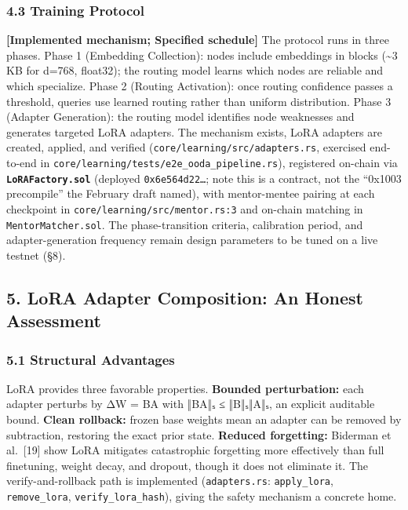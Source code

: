 \subsubsection{4.3 Training Protocol}\label{training-protocol}

\textbf{{[}Implemented mechanism; Specified schedule{]}} The protocol
runs in three phases. Phase 1 (Embedding Collection): nodes include
embeddings in blocks (\textasciitilde3 KB for d=768, float32); the
routing model learns which nodes are reliable and which specialize.
Phase 2 (Routing Activation): once routing confidence passes a
threshold, queries use learned routing rather than uniform distribution.
Phase 3 (Adapter Generation): the routing model identifies node
weaknesses and generates targeted LoRA adapters. The mechanism exists,
LoRA adapters are created, applied, and verified
(\texttt{core/learning/src/adapters.rs}, exercised end-to-end in
\texttt{core/learning/tests/e2e\_ooda\_pipeline.rs}), registered
on-chain via \textbf{\texttt{LoRAFactory.sol}} (deployed
\texttt{0x6e564d22…}; note this is a contract, not the ``0x1003
precompile'' the February draft named), with mentor-mentee pairing at
each checkpoint in \texttt{core/learning/src/mentor.rs:3} and on-chain
matching in \texttt{MentorMatcher.sol}. The phase-transition criteria,
calibration period, and adapter-generation frequency remain design
parameters to be tuned on a live testnet (§8).

\subsection{5. LoRA Adapter Composition: An Honest
Assessment}\label{lora-adapter-composition-an-honest-assessment}

\subsubsection{5.1 Structural Advantages}\label{structural-advantages}

LoRA provides three favorable properties. \textbf{Bounded perturbation:}
each adapter perturbs by ΔW = BA with ‖BA‖ₛ ≤ ‖B‖ₛ‖A‖ₛ, an explicit
auditable bound. \textbf{Clean rollback:} frozen base weights mean an
adapter can be removed by subtraction, restoring the exact prior state.
\textbf{Reduced forgetting:} Biderman et al.~{[}19{]} show LoRA
mitigates catastrophic forgetting more effectively than full finetuning,
weight decay, and dropout, though it does not eliminate it. The
verify-and-rollback path is implemented (\texttt{adapters.rs}:
\texttt{apply\_lora}, \texttt{remove\_lora},
\texttt{verify\_lora\_hash}), giving the safety mechanism a concrete
home.

